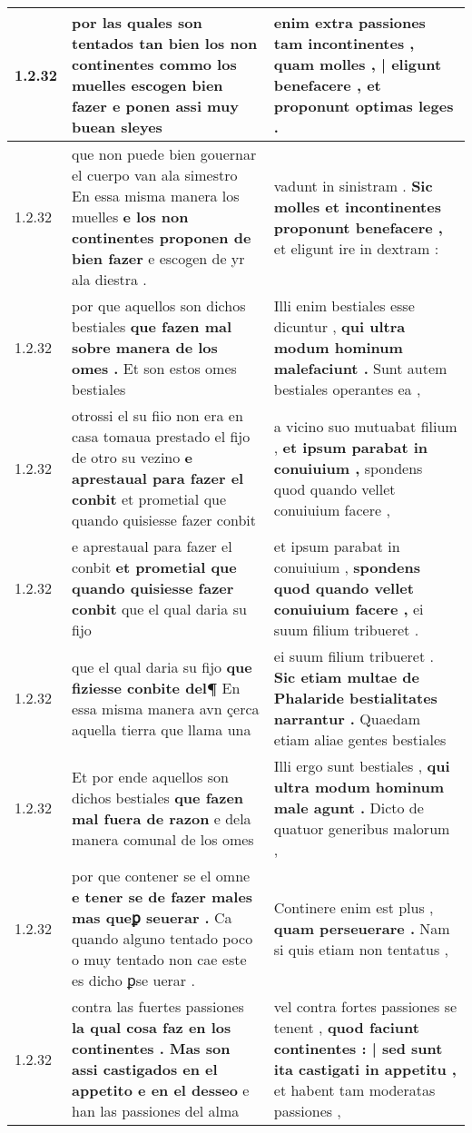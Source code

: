 \begin{tabular}{|p{1cm}|p{6.5cm}|p{6.5cm}|}
1.2.32 & por las quales son tentados tan bien los non continentes \textbf{ commo los muelles escogen bien fazer } e ponen assi muy buean sleyes & enim extra passiones tam incontinentes , \textbf{ quam molles , | eligunt benefacere , } et proponunt optimas leges . \\\hline
1.2.32 & que non puede bien gouernar el cuerpo van ala simestro En essa misma manera los muelles \textbf{ e los non continentes proponen de bien fazer } e escogen de yr ala diestra . & vadunt in sinistram . \textbf{ Sic molles et incontinentes proponunt benefacere , } et eligunt ire in dextram : \\\hline
1.2.32 & por que aquellos son dichos bestiales \textbf{ que fazen mal sobre manera de los omes . } Et son estos omes bestiales & Illi enim bestiales esse dicuntur , \textbf{ qui ultra modum hominum malefaciunt . } Sunt autem bestiales operantes ea , \\\hline
1.2.32 & otrossi el su fiio non era en casa tomaua prestado el fijo de otro su vezino \textbf{ e aprestaual para fazer el conbit } et prometial que quando quisiesse fazer conbit & a vicino suo mutuabat filium , \textbf{ et ipsum parabat in conuiuium , } spondens quod quando vellet conuiuium facere , \\\hline
1.2.32 & e aprestaual para fazer el conbit \textbf{ et prometial que quando quisiesse fazer conbit } que el qual daria su fijo & et ipsum parabat in conuiuium , \textbf{ spondens quod quando vellet conuiuium facere , } ei suum filium tribueret . \\\hline
1.2.32 & que el qual daria su fijo \textbf{ que fiziesse conbite del¶ } En essa misma manera avn çerca aquella tierra que llama una & ei suum filium tribueret . \textbf{ Sic etiam multae de Phalaride bestialitates narrantur . } Quaedam etiam aliae gentes bestiales \\\hline
1.2.32 & Et por ende aquellos son dichos bestiales \textbf{ que fazen mal fuera de razon } e dela manera comunal de los omes & Illi ergo sunt bestiales , \textbf{ qui ultra modum hominum male agunt . } Dicto de quatuor generibus malorum , \\\hline
1.2.32 & por que contener se el omne \textbf{ e tener se de fazer males mas queꝑ seuerar . } Ca quando alguno tentado poco o muy tentado non cae este es dicho ꝑse uerar . & Continere enim est plus , \textbf{ quam perseuerare . } Nam si quis etiam non tentatus , \\\hline
1.2.32 & contra las fuertes passiones \textbf{ la qual cosa faz en los continentes . Mas son assi castigados en el appetito e en el desseo } e han las passiones del alma & vel contra fortes passiones se tenent , \textbf{ quod faciunt continentes : | sed sunt ita castigati in appetitu , } et habent tam moderatas passiones , \\\hline

\end{tabular}
